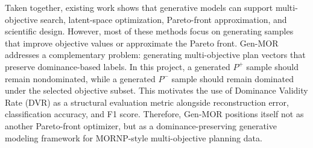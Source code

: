 Taken together, existing work shows that generative models can support multi-objective search, latent-space optimization, Pareto-front approximation, and scientific design. However, most of these methods focus on generating samples that improve objective values or approximate the Pareto front. Gen-MOR addresses a complementary problem: generating multi-objective plan vectors that preserve dominance-based labels. In this project, a generated $P^{+}$ sample should remain nondominated, while a generated $P^{-}$ sample should remain dominated under the selected objective subset. This motivates the use of Dominance Validity Rate (DVR) as a structural evaluation metric alongside reconstruction error, classification accuracy, and F1 score. Therefore, Gen-MOR positions itself not as another Pareto-front optimizer, but as a dominance-preserving generative modeling framework for MORNP-style multi-objective planning data.